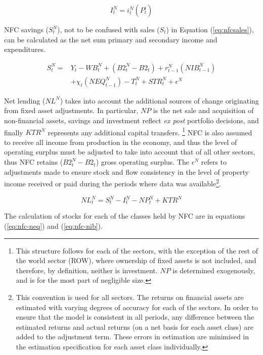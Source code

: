 \documentclass[
]{book}
\begin{document}
\begin{equation}
I^N_t = i^N_t(P^i_t)
\end{equation}

NFC savings (\(S^N_t\)), not to be confused with sales (\(S_t\)) in Equation (\ref{eq:nfcsales}),
can be calculated as the net sum primary and secondary income and expenditures.

\begin{equation}
\begin{split}
S^N_t = & Y_t - WB^N_t + (B2^N_{t} - B2_{t}) + r^N_{t-1}(NIB^N_{t-1})\\
        & + \chi _t (NEQ^N_{t-1}) - T^N_t + STR^N_t + \epsilon ^N
\end{split}
\end{equation}

Net lending (\(NL^N\)) takes into account the additional sources of change
originating from fixed asset adjustments. In particular, \(NP\) is the net
sale and acquisition of non-financial assets, savings and investment reflect
\emph{ex post} portfolio decisions, and finally \(KTR^N\) represents any additional
capital transfers. \footnote{This structure follows for each of the sectors, with the exception of the rest of the world sector (ROW), where ownership of fixed assets is not included, and therefore, by definition, neither is investment. \(NP\) is determined exogenously, and is for the most part of negligible size.} NFC is also assumed to receive all
income from production in the economy, and thus the level of operating surplus must
be adjusted to take into account that of all other sectors, thus NFC retains
(\(B2^N_{t} - B2_{t}\)) gross operating surplus. The \(\epsilon ^N\) refers to adjustments made to ensure stock and flow consistency in the level of property income received or paid during the periods where data was available\footnote{This convention is used for all sectors. The returns on financial assets are estimated with varying degrees of accuracy for each of the sectors. In order to ensure that the model is consistent in all periods, any difference between the estimated returns and actual returns (on a net basis for each asset class) are added to the adjustment term. These errors in estimation are minimised in the estimation specification for each asset class individually.}.

\begin{equation}
NL^N_t = S^N_t - I^N_t- NP^N_t + KTR^N
\end{equation}

The calculation of stocks for each of the classes held by NFC are in equations (\ref{eq:nfc-neq})
and (\ref{eq:nfc-nib}).
\end{document}
